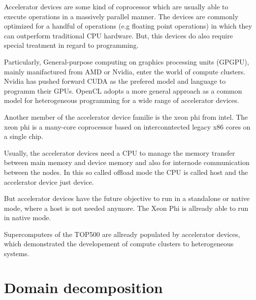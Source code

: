 Accelerator devices are some kind of coprocessor which are usually
able to execute operations in a massively parallel manner.  The
devices are commonly optimized for a handful of operations (e.g
floating point operations) in which they can outperform traditional
CPU hardware. But, this devices do also require special treatment in
regard to programming.

Particularly, General-purpose computing on graphics processing units
(GPGPU), mainly manifactured from AMD or Nvidia, enter the world of
compute clusters. Nvidia has pushed forward CUDA\cite{ref:cuda} as the
prefered model and language to programm their
GPUs. OpenCL\cite{ref:opencl} adopts a more general approach as a
common model for heterogeneous programming for a wide range of
accelerator devices.

Another member of the accelerator device familie is the xeon
phi\cite{ref:xeon_phi} from intel. The xeon phi is a many-core
coprocessor based on interconntected legacy x86 cores on a single chip.

Usually, the accelerator devices need a CPU to manage the memory
transfer between main memory and device memory and also for internode
communication between the nodes. In this so called offload mode the
CPU is called host and the accelerator device just device.

But accelerator devices have the future objective to run in a
standalone or native mode, where a host is not needed anymore.  The
Xeon Phi is allready able to run in native mode.

Supercomputers of the TOP500 are allready populated by accelerator
devices, which demonstrated the developement of compute clusters to
heterogeneous systems.

\section{Domain decomposition}
\label{sec:domain_decomposition}



